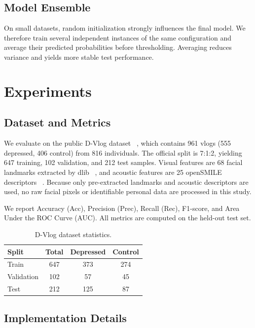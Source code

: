\documentclass[conference]{IEEEtran}
\begin{document}
\subsection{Model Ensemble}

On small datasets, random initialization strongly influences the final model.
We therefore train several independent instances of the same configuration and average their predicted probabilities before thresholding.
Averaging reduces variance and yields more stable test performance.
\section{Experiments}
\label{sec:experiments}

\subsection{Dataset and Metrics}

We evaluate on the public D-Vlog dataset~
\cite{yoon2022dvlog}, which contains 961 vlogs (555 depressed, 406 control) from 816 individuals.
The official split is 7:1:2, yielding 647 training, 102 validation, and 212 test samples.
Visual features are 68 facial landmarks extracted by dlib~
\cite{king2009dlib}, and acoustic features are 25 openSMILE descriptors~
\cite{eyben2010opensmile}.
Because only pre-extracted landmarks and acoustic descriptors are used, no raw facial pixels or identifiable personal data are processed in this study.

We report Accuracy (Acc), Precision (Prec), Recall (Rec), F1-score, and Area Under the ROC Curve (AUC).
All metrics are computed on the held-out test set.

\begin{table}[t]
\centering
\caption{D-Vlog dataset statistics.}
\label{tab:dataset}
\begin{tabular}{lccc}
\toprule[1.2pt]
Split & Total & Depressed & Control \\
\midrule[0.8pt]
Train & 647 & 373 & 274 \\
Validation & 102 & 57 & 45 \\
Test & 212 & 125 & 87 \\
\bottomrule[1.2pt]
\end{tabular}
\end{table}

\subsection{Implementation Details}
\end{document}
